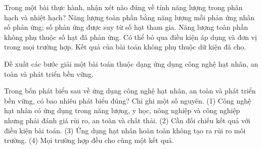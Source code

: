 \begin{ex}
Trong một bài thực hành, nhận xét nào đúng về tính năng lượng trong phân hạch và nhiệt hạch?
\choice
{\True Năng lượng toàn phần bằng năng lượng mỗi phản ứng nhân số phản ứng; số phản ứng được suy từ số hạt tham gia.}
{Năng lượng toàn phần không phụ thuộc số hạt đã phản ứng.}
{Có thể bỏ qua điều kiện áp dụng và đơn vị trong mọi trường hợp.}
{Kết quả của bài toán không phụ thuộc dữ kiện đã cho.}
\end{ex}

\begin{bt}
Đề xuất các bước giải một bài toán thuộc dạng ứng dụng công nghệ hạt nhân, an toàn và phát triển bền vững.
\end{bt}

\begin{ex}
Trong bốn phát biểu sau về ứng dụng công nghệ hạt nhân, an toàn và phát triển bền vững, có bao nhiêu phát biểu đúng? Chỉ ghi một số nguyên. (1) Công nghệ hạt nhân có ứng dụng trong năng lượng, y học, nông nghiệp và công nghiệp nhưng phải đánh giá rủi ro, an toàn và chất thải. (2) Cần đối chiếu kết quả với điều kiện bài toán. (3) Ứng dụng hạt nhân hoàn toàn không tạo ra rủi ro môi trường. (4) Mọi trường hợp đều cho cùng một kết quả.
\end{ex}

